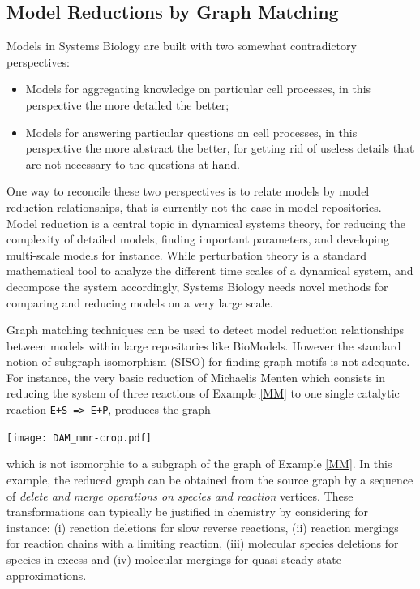 \documentclass[graybox]{svmult}
\begin{document}
\subsection{Model Reductions by Graph Matching}\label{reduc}

Models in Systems Biology are built with two somewhat contradictory perspectives:
\begin{itemize}
\item Models for aggregating knowledge on particular cell processes, in this perspective the more detailed the better;
\item Models for answering particular questions on cell processes, in this perspective the more abstract the better,
  for getting rid of useless details that are not necessary to the questions at hand.
\end{itemize}
One way to reconcile these two perspectives is to relate models by model reduction relationships,
that is currently not the case in model repositories.
Model reduction is a central topic in dynamical systems theory, for reducing the complexity of detailed models,
finding important parameters, and developing multi-scale models for instance.
While perturbation theory is a standard mathematical tool to analyze the different time scales of a dynamical system,
and decompose the system accordingly, Systems Biology needs novel methods for comparing and reducing models on a very large scale.

Graph matching techniques can be used to detect model reduction relationships between models within large repositories like BioModels.
However the standard notion of subgraph isomorphism (SISO) for finding graph motifs is not adequate.
For instance, the very basic reduction of Michaelis Menten which consists in reducing the system of three reactions of Example \ref{MM}
to one single catalytic reaction {\small\verb|E+S => E+P|},
produces the graph
\begin{center}
  \texttt{[image: DAM\_mmr-crop.pdf]}
  \end{center}
which is not isomorphic to a subgraph of the graph of Example \ref{MM}.
%
In this example, the reduced graph can be obtained from the source graph by a sequence of \emph{delete and merge operations on species and reaction} vertices.
These transformations can typically be justified in chemistry by considering for instance: (i) reaction deletions for slow reverse reactions, (ii) reaction mergings for reaction chains with a limiting reaction, (iii) molecular species deletions for species in excess and (iv) molecular mergings for quasi-steady state approximations.
\end{document}
